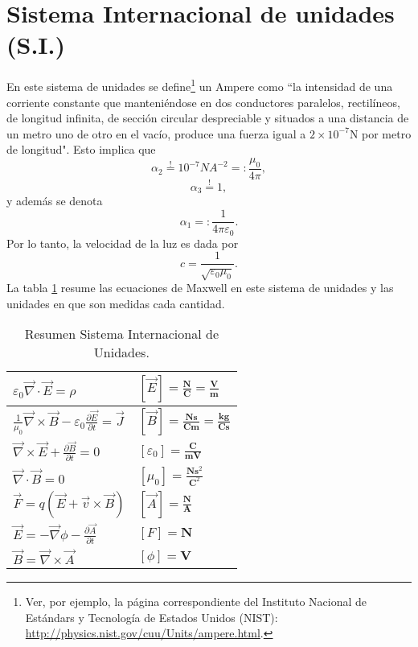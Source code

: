 \section{Sistema Internacional de unidades (S.I.)}
En este sistema de unidades se define\footnote{Ver, por ejemplo, la página correspondiente del Instituto Nacional de Estándars y Tecnología de Estados Unidos (NIST): \url{http://physics.nist.gov/cuu/Units/ampere.html}.} un Ampere como ``la intensidad de una corriente constante que manteniéndose en dos conductores paralelos, rectilíneos, de longitud infinita, de sección circular despreciable y situados a una distancia de un metro uno de otro en el vacío, produce una fuerza igual a $2\times 10^{-7}$N por metro de longitud". Esto implica que
\begin{equation}
\alpha_2\stackrel{!}{=} 10^{-7}NA^{-2}=:\frac{\mu_0}{4\pi},
\end{equation}
\begin{equation}
\alpha_3\stackrel{!}{=} 1,
\end{equation}
y además se denota
\begin{equation}
\alpha_1=:\frac{1}{4\pi\varepsilon_0}.
\end{equation}
Por lo tanto, la velocidad de la luz es dada por
\begin{equation}
c=\frac{1}{\sqrt{\varepsilon_0\mu_0}}.
\end{equation}
La tabla \ref{TUSI} resume las ecuaciones de Maxwell en este sistema de unidades y las unidades en que son medidas cada cantidad. 
\begin{table}
\begin{center}
\begin{tabular}{|l|l|}\hline
$\varepsilon_0\vec{\nabla}\cdot\vec{E}=\rho$ & $\left[ \vec{E}
\right] =\frac{\mathbf{N}}{\mathbf{C}}=\frac{\mathbf{V}}{\mathbf{m}}$\\\hline
$\frac{1}{\mu_0}\vec{\nabla}\times \vec{B}-\varepsilon_0\frac{\partial
\vec{E}}{\partial t}= \vec{J}$ &
$\left[\vec{B}\right]=\frac{\mathbf{N}\mathbf{s}}{\mathbf{C}\mathbf{m}}
=\frac{\mathbf{kg}}{\mathbf{C}\mathbf{s}}$\\\hline
$\vec{\nabla}\times \vec{E}+\frac{\partial\vec{B}}{\partial t}=0$ &
$\left[\varepsilon_0\right]=\frac{\mathbf{C}}{\mathbf{m}\mathbf{V}}$\\\hline
$\vec{\nabla}\cdot\vec{B}=0$ & $\left[\mu_0\right]=\frac{\mathbf{N}\mathbf{s}^2}
{\mathbf{C}^2}$\\\hline
$\vec{F}=q\left(\vec{E}+\vec{v}\times\vec{B}\right) $ &
$\left[\vec{A}\right]=\frac{\mathbf{N}}{\mathbf{A}}$\\\hline
$\vec{E}=-\vec{\nabla}\phi-\frac{\partial\vec{A}}{\partial t}$ &
$\left[F\right]=\mathbf{N}$\\\hline
$\vec{B}=\vec{\nabla}\times \vec{A}$ & $\left[\phi\right]=\mathbf{V}$ \\\hline
\end{tabular}
\label{TUSI}
\caption{Resumen Sistema Internacional de Unidades.}
\end{center}
\end{table}


